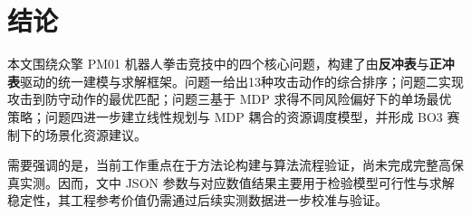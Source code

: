 \section{结论}
本文围绕众擎 PM01 机器人拳击竞技中的四个核心问题，构建了由\textbf{反冲表}与\textbf{正冲表}驱动的统一建模与求解框架。问题一给出13种攻击动作的综合排序；问题二实现攻击到防守动作的最优匹配；问题三基于 MDP 求得不同风险偏好下的单场最优策略；问题四进一步建立线性规划与 MDP 耦合的资源调度模型，并形成 BO3 赛制下的场景化资源建议。

需要强调的是，当前工作重点在于方法论构建与算法流程验证，尚未完成完整高保真实测。因而，文中 JSON 参数与对应数值结果主要用于检验模型可行性与求解稳定性，其工程参考价值仍需通过后续实测数据进一步校准与验证。

